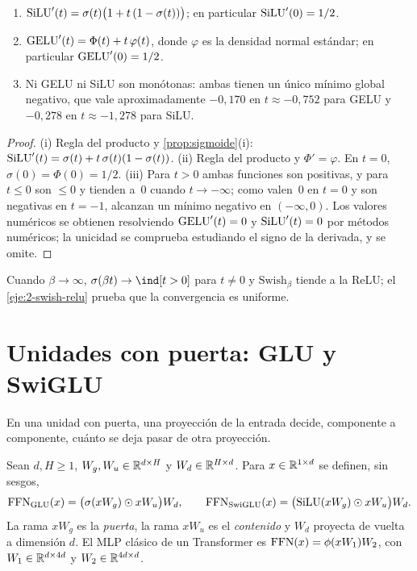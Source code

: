 \begin{proposicion}\label{prop:silu}
\begin{enumerate}
  \item $\operatorname{SiLU}'(t)=\sigma(t)\bigl(1+t\,(1-\sigma(t))\bigr)$; en particular $\operatorname{SiLU}'(0)=1/2$.
  \item $\operatorname{GELU}'(t)=\Phi(t)+t\,\varphi(t)$, donde $\varphi$ es la densidad normal estándar; en particular $\operatorname{GELU}'(0)=1/2$.
  \item Ni GELU ni SiLU son monótonas: ambas tienen un único mínimo global negativo, que vale aproximadamente $-0{,}170$ en $t\approx-0{,}752$ para GELU y $-0{,}278$ en $t\approx-1{,}278$ para SiLU.
\end{enumerate}
\end{proposicion}

\begin{proof}
(i) Regla del producto y \cref{prop:sigmoide}(i): $\operatorname{SiLU}'(t)=\sigma(t)+t\,\sigma(t)(1-\sigma(t))$. (ii) Regla del producto y $\Phi'=\varphi$. En $t=0$, $\sigma(0)=\Phi(0)=1/2$. (iii) Para $t>0$ ambas funciones son positivas, y para $t\le 0$ son $\le 0$ y tienden a~0 cuando $t\to-\infty$; como valen~0 en $t=0$ y son negativas en $t=-1$, alcanzan un mínimo negativo en $(-\infty,0)$. Los valores numéricos se obtienen resolviendo $\operatorname{GELU}'(t)=0$ y $\operatorname{SiLU}'(t)=0$ por métodos numéricos; la unicidad se comprueba estudiando el signo de la derivada, y se omite.
\end{proof}

Cuando $\beta\to\infty$, $\sigma(\beta t)\to\ind[t>0]$ para $t\neq 0$ y $\mathrm{Swish}_\beta$ tiende a la ReLU; el \cref{eje:2-swish-relu} prueba que la convergencia es uniforme.

\section{Unidades con puerta: GLU y SwiGLU}

En una unidad con puerta, una proyección de la entrada decide, componente a componente, cuánto se deja pasar de otra proyección.

\begin{definicion}\label{def:swiglu}
Sean $d,H\ge 1$, $W_g,W_u\in\mathbb{R}^{d\times H}$ y $W_d\in\mathbb{R}^{H\times d}$. Para $x\in\mathbb{R}^{1\times d}$ se definen, sin sesgos,
\[
\operatorname{FFN}_{\mathrm{GLU}}(x)=\bigl(\sigma(xW_g)\odot xW_u\bigr)W_d,\qquad
\operatorname{FFN}_{\mathrm{SwiGLU}}(x)=\bigl(\operatorname{SiLU}(xW_g)\odot xW_u\bigr)W_d.
\]
La rama $xW_g$ es la \emph{puerta}, la rama $xW_u$ es el \emph{contenido} y $W_d$ proyecta de vuelta a dimensión $d$. El MLP clásico de un Transformer es $\operatorname{FFN}(x)=\phi(xW_1)W_2$, con $W_1\in\mathbb{R}^{d\times 4d}$ y $W_2\in\mathbb{R}^{4d\times d}$.
\end{definicion}

